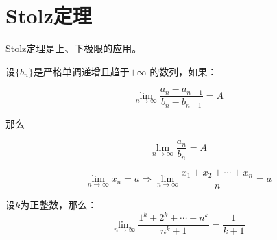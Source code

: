 \section{Stolz定理}

Stolz定理是上、下极限的应用。

\begin{theorem}
	设$\{b_n\}$是严格单调递增且趋于$+\infty$ 的数列，如果：
	
	$$
	\lim_{n\rightarrow \infty} \frac{a_n - a_{n-1}}{b_n - b_{n-1}} = A
	$$
	
\noindent	那么

	$$
	\lim_{n\rightarrow \infty} \frac{a_n}{b_n} = A
	$$
\end{theorem}


\begin{example}
	$$
	\lim_{n\rightarrow \infty} x_n=a \Rightarrow \lim_{n\rightarrow \infty} \frac{x_1 + x_2 + \cdots + x_n}{n} = a
	$$
\end{example}

\begin{example}
	设$k$为正整数，那么：
	$$
	\lim_{n\rightarrow \infty} \frac{1^k + 2 ^ k + \cdots + n ^ k}{n^k+1} = \frac{1}{k+1}
	$$
\end{example}












